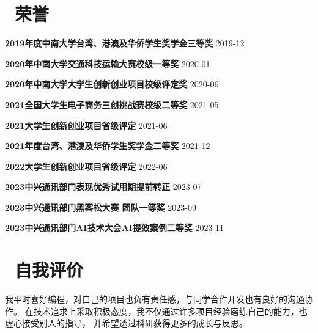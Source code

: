 \documentclass[10pt, a4paper]{article}
\begin{document}
\section{\color{CVBlue}\faHeart\ 荣誉}
\textbf{2019年度中南大学台湾、港澳及华侨学生奖学金三等奖} \hfill 2019-12

\textbf{2020年中南大学交通科技运输大赛校级一等奖} \hfill 2020-01

\textbf{2020年中南大学大学生创新创业项目校级评定奖} \hfill 2020-06

\textbf{2021全国大学生电子商务三创挑战赛校级二等奖} \hfill 2021-05

\textbf{2021大学生创新创业项目省级评定} \hfill 2021-06

\textbf{2021年度台湾、港澳及华侨学生奖学金二等奖} \hfill 2021-12

\textbf{2022大学生创新创业项目省级评定} \hfill 2022-06

\textbf{2023中兴通讯部门表现优秀试用期提前转正} \hfill 2023-07

\textbf{2023中兴通讯部门黑客松大赛 团队一等奖} \hfill 2023-09

\textbf{2023中兴通讯部门AI技术大会AI提效案例二等奖} \hfill 2023-11



\section{\color{CVBlue}\faChalkboard\ 自我评价}

\quad\quad 我平时喜好编程，对自己的项目也负有责任感，与同学合作开发也有良好的沟通协作。
在技术追求上采取积极态度，我不仅通过许多项目经验磨练自己的能力，也虚心接受别人的指导，
并希望透过科研获得更多的成长与反思。
\end{document}
